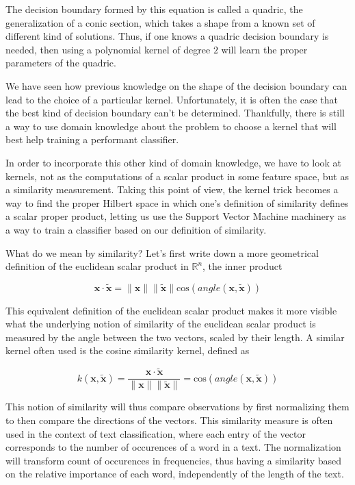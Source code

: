 The decision boundary formed by this equation is called a quadric, the generalization of a conic section, which takes a shape from a known set of different kind of solutions. Thus, if one knows a quadric decision boundary is needed, then using a polynomial kernel of degree $2$ will learn the proper parameters of the quadric.

We have seen how previous knowledge on the shape of the decision boundary can lead to the choice of a particular kernel. Unfortunately, it is often the case that the best kind of decision boundary can't be determined. Thankfully, there is still a way to use domain knowledge about the problem to choose a kernel that will best help training a performant classifier.


In order to incorporate this other kind of domain knowledge, we have to look at kernels, not as the computations of a scalar product in some feature space, but as a similarity measurement. Taking this point of view, the kernel trick becomes a way to find the proper Hilbert space in which one's definition of similarity defines a scalar proper product, letting us use the Support Vector Machine machinery as a way to train a classifier based on our definition of similarity.

What do we mean by similarity? Let's first write down a more geometrical  definition of the euclidean scalar product in $\mathbb{R}^n$, the inner product 

\begin{equation*}
  \mathbf{x} \cdot \mathbf{\tilde{x}} = \|\mathbf{x}\|\|\mathbf{\tilde{x}}\|\text{cos}\left(angle\left(\mathbf{x}, \mathbf{\tilde{x}}\right)
  \right)
\end{equation*}

This equivalent definition of the euclidean scalar product makes it more visible what the underlying notion of similarity of the euclidean scalar product is measured by the angle between the two vectors, scaled by their length. A similar kernel often used is the cosine similarity kernel, defined as

\begin{equation*}
  k(\mathbf{x}, \mathbf{\tilde{x}}) = \frac{\mathbf{x} \cdot \mathbf{\tilde{x}}}{\|\mathbf{x}\|\|\mathbf{\tilde{x}}\|} = \text{cos}\left(angle\left(\mathbf{x}, \mathbf{\tilde{x}}\right)\right)
\end{equation*}

This notion of similarity will thus compare observations by first normalizing them to then compare the directions of the vectors. This similarity measure is often used in the context of text classification, where each entry of the vector corresponds to the number of occurences of a word in a text. The normalization will transform count of occurences in frequencies, thus having a similarity based on the relative importance of each word, independently of the length of the text.

